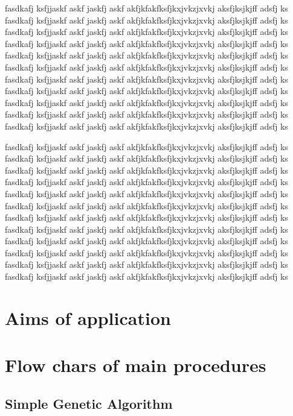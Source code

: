 \documentclass[a4paper,11pt,twocolumn]{article}
\begin{document}
fasdkafj ksfjjaskf askf jaskfj askf akfjkfakfksfjkxjvkzjxvkj aksfjksjkjff adsfj ks
fasdkafj ksfjjaskf askf jaskfj askf akfjkfakfksfjkxjvkzjxvkj aksfjksjkjff adsfj ks
fasdkafj ksfjjaskf askf jaskfj askf akfjkfakfksfjkxjvkzjxvkj aksfjksjkjff adsfj ks
fasdkafj ksfjjaskf askf jaskfj askf akfjkfakfksfjkxjvkzjxvkj aksfjksjkjff adsfj ks
fasdkafj ksfjjaskf askf jaskfj askf akfjkfakfksfjkxjvkzjxvkj aksfjksjkjff adsfj ks
fasdkafj ksfjjaskf askf jaskfj askf akfjkfakfksfjkxjvkzjxvkj aksfjksjkjff adsfj ks
fasdkafj ksfjjaskf askf jaskfj askf akfjkfakfksfjkxjvkzjxvkj aksfjksjkjff adsfj ks
fasdkafj ksfjjaskf askf jaskfj askf akfjkfakfksfjkxjvkzjxvkj aksfjksjkjff adsfj ks
fasdkafj ksfjjaskf askf jaskfj askf akfjkfakfksfjkxjvkzjxvkj aksfjksjkjff adsfj ks
fasdkafj ksfjjaskf askf jaskfj askf akfjkfakfksfjkxjvkzjxvkj aksfjksjkjff adsfj ks
fasdkafj ksfjjaskf askf jaskfj askf akfjkfakfksfjkxjvkzjxvkj aksfjksjkjff adsfj ks

fasdkafj ksfjjaskf askf jaskfj askf akfjkfakfksfjkxjvkzjxvkj aksfjksjkjff adsfj ks
fasdkafj ksfjjaskf askf jaskfj askf akfjkfakfksfjkxjvkzjxvkj aksfjksjkjff adsfj ks
fasdkafj ksfjjaskf askf jaskfj askf akfjkfakfksfjkxjvkzjxvkj aksfjksjkjff adsfj ks
fasdkafj ksfjjaskf askf jaskfj askf akfjkfakfksfjkxjvkzjxvkj aksfjksjkjff adsfj ks
fasdkafj ksfjjaskf askf jaskfj askf akfjkfakfksfjkxjvkzjxvkj aksfjksjkjff adsfj ks
fasdkafj ksfjjaskf askf jaskfj askf akfjkfakfksfjkxjvkzjxvkj aksfjksjkjff adsfj ks
fasdkafj ksfjjaskf askf jaskfj askf akfjkfakfksfjkxjvkzjxvkj aksfjksjkjff adsfj ks
fasdkafj ksfjjaskf askf jaskfj askf akfjkfakfksfjkxjvkzjxvkj aksfjksjkjff adsfj ks
fasdkafj ksfjjaskf askf jaskfj askf akfjkfakfksfjkxjvkzjxvkj aksfjksjkjff adsfj ks
fasdkafj ksfjjaskf askf jaskfj askf akfjkfakfksfjkxjvkzjxvkj aksfjksjkjff adsfj ks
fasdkafj ksfjjaskf askf jaskfj askf akfjkfakfksfjkxjvkzjxvkj aksfjksjkjff adsfj ks
fasdkafj ksfjjaskf askf jaskfj askf akfjkfakfksfjkxjvkzjxvkj aksfjksjkjff adsfj ks

\section{Aims of application}

\section{Flow chars of main procedures}

\subsection{Simple Genetic Algorithm}
\end{document}
